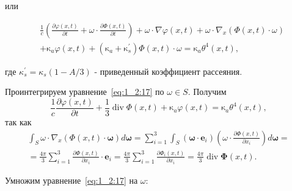 или

\begin{equation}
    \label{eq:1_2:17}
    \begin{aligned}
        &\frac{1}{c}\left(\frac{\partial \varphi(x, t)}{\partial t}
        + \omega \cdot \frac{\partial \Phi(x, t)}{\partial t}\right)
        + \omega \cdot \nabla \varphi(x, t)
        + \omega \cdot \nabla_{x}(\Phi(x, t) \cdot \omega) \\
        &+ \mathrm{\kappa}_{a} \varphi(x, t)+\left(\mathrm{\kappa}_{a}
        + \mathrm{\kappa}_{s}^{\prime}\right)
        \Phi(x, t) \cdot \omega = \mathrm{\kappa}_{a} \theta^{4}(x, t),
    \end{aligned}
\end{equation}

где $\kappa_{s}^{\prime}=\kappa_{s}(1-A / 3)$ - приведенный коэффициент рассеяния.


Проинтегрируем уравнение~\eqref{eq:1_2:17} по $\omega \in S$.
Получим
\begin{equation}
    \label{eq:1_2:18}
    \frac{1}{c} \frac{\partial \varphi(x, t)}{\partial t}
    + \frac{1}{3} \operatorname{div} \Phi(x, t)
    + \mathrm{\kappa}_{a} \varphi(x, t)
    = \mathrm{\kappa}_{a} \theta^{4}(x, t),
\end{equation}
так как
\[
    \begin{gathered}
        \int_{S} \omega \cdot \nabla_{x}(\Phi(x, t)
        \cdot \boldsymbol{\omega}) d \boldsymbol{\omega}=\sum_{i=1}^{3}
        \int_{S}\left(\boldsymbol{\omega}
        \cdot \mathbf{e}_{i}\right)\left(\omega \cdot
        \frac{\partial \Phi(x, t)}{\partial x_{i}}\right) d \boldsymbol{\omega} = \\
        = \frac{4 \pi}{3} \sum_{i=1}^{3} \frac{\partial \Phi(x, t)}{\partial x_{i}} \cdot
        \mathbf{e}_{i}=\frac{4 \pi}{3} \sum_{i=1}^{3}
        \frac{\partial \Phi_{i}(x, t)}{\partial x_{i}}=
        \frac{4 \pi}{3} \operatorname{div} \boldsymbol{\Phi}(x, t).
    \end{gathered}
\]

Умножим уравнение~\eqref{eq:1_2:17} на $\omega:$

